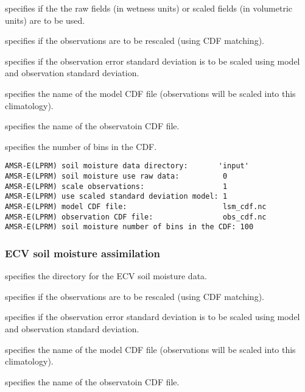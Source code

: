   specifies if the 
 the raw fields (in wetness units) or scaled fields
 (in volumetric units) are to be used.

  specifies if the
 observations are to be rescaled (using CDF matching).

  specifies if
 the observation error standard deviation is to be scaled using
 model and observation standard deviation.

  specifies the
 name of the model CDF file (observations will be scaled into this
 climatology).

  specifies the
 name of the observatoin CDF file.

 specifies the number of bins in the CDF.
 

 \begin{Verbatim}[frame=single]
AMSR-E(LPRM) soil moisture data directory:       'input'
AMSR-E(LPRM) soil moisture use raw data:          0 
AMSR-E(LPRM) scale observations:                  1
AMSR-E(LPRM) use scaled standard deviation model: 1
AMSR-E(LPRM) model CDF file:                      lsm_cdf.nc
AMSR-E(LPRM) observation CDF file:                obs_cdf.nc
AMSR-E(LPRM) soil moisture number of bins in the CDF: 100 
 \end{Verbatim}

 
 \subsubsection{ECV soil moisture assimilation}
 \label{sssec:ecvsmda}
 

 
  specifies the directory
 for the ECV soil moisture data.

  specifies if the
 observations are to be rescaled (using CDF matching).

  specifies if
 the observation error standard deviation is to be scaled using
 model and observation standard deviation.

  specifies the
 name of the model CDF file (observations will be scaled into this
 climatology).

  specifies the
 name of the observatoin CDF file.

